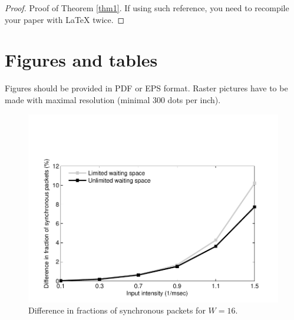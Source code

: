 \documentclass[10pt]{article}
\begin{document}
\begin{proof}
Proof of Theorem \ref{thm1}. If using such reference, you need
to recompile your paper with \LaTeX{} twice.
\end{proof}


\section{Figures and tables}

Figures should be provided in PDF or EPS format. Raster pictures have
to be made with maximal resolution (minimal 300 dots per inch).

\begin{figure}[h!]
   \centering
    \includegraphics[width=\textwidth]{1.pdf} %
    \caption {Difference in fractions of synchronous packets for $W=16$.}
    \label{pic1}
\end{figure}
\end{document}

